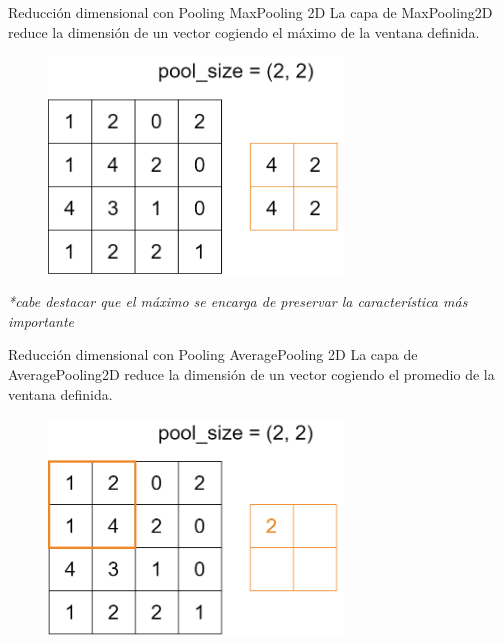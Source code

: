 \begin{frame}{Reducción dimensional con Pooling}
\alert{\Large MaxPooling 2D}
La capa de MaxPooling2D reduce la dimensión de un vector cogiendo el \alert{máximo} de la ventana definida.

\begin{figure}
    \centering
    \includegraphics[width=0.7\textwidth]{Slides/figures/Tema 3/MaxPooling_res.png}
\end{figure}
\textit{*cabe destacar que el máximo se encarga de preservar la característica más importante}
\end{frame}

\begin{frame}{Reducción dimensional con Pooling}
\alert{\Large AveragePooling 2D}
La capa de AveragePooling2D reduce la dimensión de un vector cogiendo el \alert{promedio} de la ventana definida.

\begin{figure}
    \centering
    \includegraphics[width=0.7\textwidth]{Slides/figures/Tema 3/AvgPooling_1.png}
\end{figure}
\end{frame}

